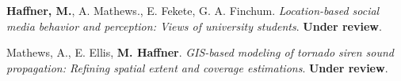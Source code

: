 




\begin{cventries}
   \cventry
      {}
      {}
      {}
      {}
      {
        \begin{cvitems}
          \vspace{-4mm}
        \item {\textbf{Haffner, M.}, A. Mathews., E. Fekete, G. A. Finchum.
            \textit{Location-based social media behavior and perception: Views
              of university students}. \textbf{Under review}.} \\
          \vspace{-2mm}
        \item
          {Mathews, A., E. Ellis, \textbf{M. Haffner}.
            \textit{GIS-based modeling of tornado siren sound propagation:
              Refining spatial extent and coverage estimations}. \textbf{Under review}.} \\
        \end{cvitems}
    }
\end{cventries}


\vspace{-5mm}


